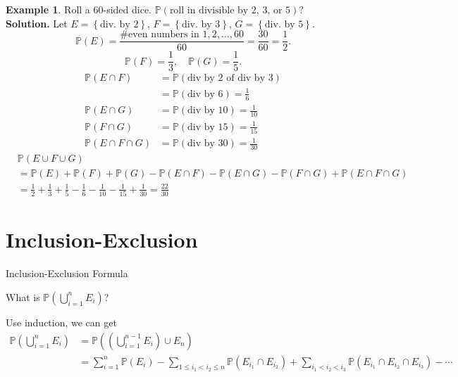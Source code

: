 \documentclass[a4paper,11pt]{amsbook}
\makeatletter
\def\section{\@startsection{section}{2}%
    \z@{1\linespacing\@plus1\linespacing}{.5\linespacing}%
    {\large\normalfont\bfseries\centering\color{darkblue}}}
\theoremstyle{definition}
\newtheorem{example}{\hspace{-2em} \color{darkblue} Example}[chapter]
\theoremstyle{remark}
\renewcommand{\P}{\mathbb{P}}
\newcommand\0{\varnothing}
\makeatother
\begin{document}
    \begin{example}
        Roll a 60-sided dice. $\P(\text{roll in divisible by 2, 3, or 5})$?\\
        \textbf{Solution.} Let $E=\left\{\text{div. by 2}\right\}$, $F=\left\{\text{div. by 3}\right\}$, $G=\left\{\text{div. by 5}\right\}$.
        $$\P(E)=\frac{\#\text{even numbers in }1,2,\ldots,60}{60}=\frac{30}{60}=\frac12.$$
        $$\P(F)=\frac13,\quad\P(G)=\frac15.$$
        \begin{align*}
            \P(E\cap F)&=\P(\text{div by 2 of div by 3}) \\
            &=\P(\text{div by 6})=\frac16 \\
            \P(E\cap G)&=\P(\text{div by 10})=\frac1{10} \\
            \P(F\cap G)&=\P(\text{div by 15})=\frac1{15} \\
            \P(E\cap F\cap G)&=\P(\text{div by 30})=\frac1{30}
        \end{align*}
        \begin{align*}
            &\P(E\cup F\cup G) \\
            &=\P(E)+\P(F)+\P(G)-\P(E\cap F)-\P(E\cap G)-\P(F\cap G)+\P(E\cap F\cap G) \\
            &=\frac12+\frac13+\frac15-\frac16-\frac1{10}-\frac1{15}+\frac1{30}=\frac{22}{30}
        \end{align*}
    \end{example}

\chapter{Inclusion-Exclusion} 
    
    \section{Inclusion-Exclusion Formula}
    
    What is $\P\left(\bigcup_{i=1}^n E_i\right)$?

    Use induction, we can get \begin{align*}
        \P\left(\bigcup_{i=1}^n E_i\right)&=\P\left(\left( \bigcup_{i=1}^{n-1} E_i \right)\cup E_n\right) \\
        &=\sum_{i=1}^n\P(E_i)-\sum_{1\leq i_1<i_2\leq n}\P(E_{i_1}\cap E_{i_2})+\sum_{i_1<i_2<i_3}\P(E_{i_1}\cap E_{i_2}\cap E_{i_3})-\cdots
    \end{align*}
\end{document}
